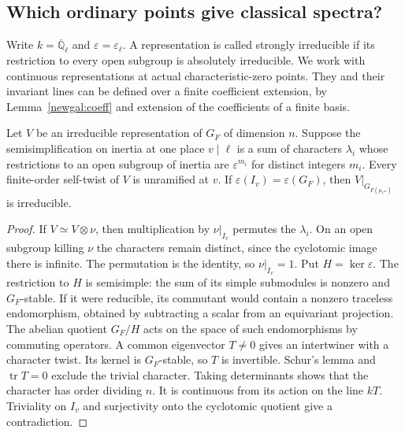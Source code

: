 \subsection{Which ordinary points give classical spectra?}\label{spreal:section}

Write \(k=\overline{\mathbb Q}_\ell\) and
\(\varepsilon=\varepsilon_\ell\). A representation is called strongly
irreducible if its restriction to every open subgroup is absolutely
irreducible. We work with continuous representations at actual
characteristic-zero points. They and their invariant lines can be defined
over a finite coefficient extension, by Lemma~\ref{newgal:coeff} and
extension of the coefficients of a finite basis.

\begin{lemma}\label{spreal:twists}
Let \(V\) be an irreducible representation of \(G_F\) of dimension \(n\).
Suppose the semisimplification on inertia at one place \(v\mid\ell\)
is a sum of characters \(\lambda_i\) whose restrictions to an open
subgroup of inertia are \(\varepsilon^{m_i}\) for distinct integers \(m_i\).
Every finite-order self-twist of \(V\) is unramified at \(v\).
If \(\varepsilon(I_v)=\varepsilon(G_F)\), then
\(V|_{G_{F(\mu_{\ell^\infty})}}\) is irreducible.
\end{lemma}
\begin{proof}
If \(V\simeq V\otimes\nu\), then multiplication by \(\nu|_{I_v}\)
permutes the \(\lambda_i\). On an open subgroup killing \(\nu\) the
characters remain distinct, since the cyclotomic image there is
infinite. The permutation is the identity, so \(\nu|_{I_v}=1\).
Put \(H=\ker\varepsilon\). The restriction to \(H\) is semisimple:
the sum of its simple submodules is nonzero and \(G_F\)-stable.
If it were reducible, its commutant would contain a nonzero traceless
endomorphism, obtained by subtracting a scalar from an equivariant
projection. The abelian quotient \(G_F/H\) acts on the space of such
endomorphisms by commuting operators. A common eigenvector \(T\ne0\)
gives an intertwiner with a character twist. Its kernel is
\(G_F\)-stable, so \(T\) is invertible. Schur's lemma and
\(\operatorname{tr}T=0\) exclude the trivial character. Taking
determinants shows that the character has order dividing \(n\).
It is continuous from its action on the line \(kT\). Triviality on
\(I_v\) and surjectivity onto the cyclotomic quotient give a contradiction.
\end{proof}

